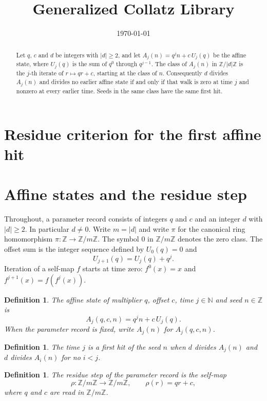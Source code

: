 \documentclass[11pt,letterpaper]{article}
\title{Generalized Collatz Library}
\author{}
\date{\today}
\newcommand{\N}{\mathbb{N}}
\newcommand{\Z}{\mathbb{Z}}
\newcommand{\Map}[3]{#1 \colon #2 \to #3}
\newtheorem{definition}[theorem]{Definition}
\begin{document}
\maketitle
\section*{Residue criterion for the first affine hit}

\begin{abstract}
Let \(q\), \(c\) and \(d\) be integers with \(|d|\ge 2\), and let
\(A_{j}(n)=q^{j}n+c\,U_{j}(q)\) be the affine state, where \(U_{j}(q)\) is the
sum of \(q^{0}\) through \(q^{j-1}\). The class of \(A_{j}(n)\) in
\(\Z/|d|\Z\) is the \(j\)-th iterate of \(r\mapsto qr+c\), starting at the
class of \(n\). Consequently \(d\) divides \(A_{j}(n)\) and divides no earlier
affine state if and only if that walk is zero at time \(j\) and nonzero at
every earlier time. Seeds in the same class have the same first hit.
\end{abstract}

\section{Affine states and the residue step}

Throughout, a parameter record consists of integers \(q\) and \(c\) and an
integer \(d\) with \(|d|\ge 2\). In particular \(d\neq 0\). Write \(m=|d|\) and
write \(\pi\) for the canonical ring homomorphism \(\Map{\pi}{\Z}{\Z/m\Z}\).
The symbol \(0\) in \(\Z/m\Z\) denotes the zero class. The offset sum is the
integer sequence defined by \(U_{0}(q)=0\) and
\[
U_{j+1}(q)=U_{j}(q)+q^{j}.
\]
Iteration of a self-map \(f\) starts at time zero: \(f^{0}(x)=x\) and
\(f^{j+1}(x)=f(f^{j}(x))\).

\begin{definition}\label{Def:AffineState}
The affine state of multiplier \(q\), offset \(c\), time \(j\in\N\) and seed
\(n\in\Z\) is
\[
A_{j}(q,c,n)=q^{j}n+c\,U_{j}(q).
\]
When the parameter record is fixed, write \(A_{j}(n)\) for \(A_{j}(q,c,n)\).
\end{definition}

\begin{definition}\label{Def:FirstHit}
The time \(j\) is a first hit of the seed \(n\) when \(d\) divides \(A_{j}(n)\)
and \(d\) divides \(A_{i}(n)\) for no \(i<j\).
\end{definition}

\begin{definition}\label{Def:ResidueStep}
The residue step of the parameter record is the self-map
\[
\Map{\rho}{\Z/m\Z}{\Z/m\Z},\qquad \rho(r)=q r+c,
\]
where \(q\) and \(c\) are read in \(\Z/m\Z\).
\end{definition}
\end{document}
